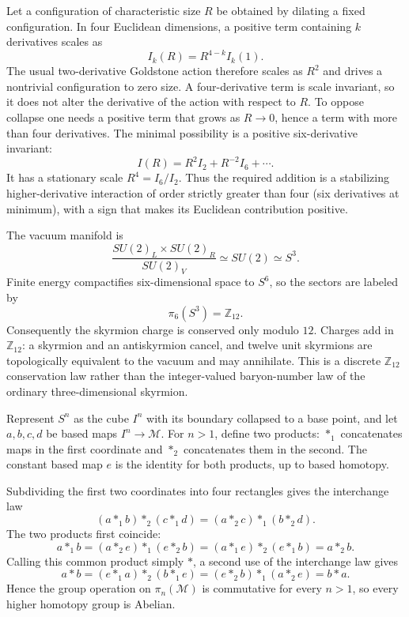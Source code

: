 \ExerciseEditorialNote

\begin{enumerate}
  Let a configuration of characteristic size \(R\) be obtained by
  dilating a fixed configuration.  In four Euclidean dimensions, a
  positive term containing \(k\) derivatives scales as
  \[
    I_k(R)=R^{4-k}I_k(1).
  \]
  The usual two-derivative Goldstone action therefore scales as \(R^2\)
  and drives a nontrivial configuration to zero size.  A four-derivative
  term is scale invariant, so it does not alter the derivative of the
  action with respect to \(R\).  To oppose collapse one needs a positive
  term that grows as \(R\to0\), hence a term with more than four
  derivatives.  The minimal possibility is a positive six-derivative
  invariant:
  \[
    I(R)=R^2I_2+R^{-2}I_6+\cdots .
  \]
  It has a stationary scale
  \(R^4=I_6/I_2\).  Thus the required addition is a stabilizing
  higher-derivative interaction of order strictly greater than four
  (six derivatives at minimum), with a sign that makes its Euclidean
  contribution positive.

  The vacuum manifold is
  \[
    \frac{SU(2)_L\times SU(2)_R}{SU(2)_V}\simeq SU(2)\simeq S^3.
  \]
  Finite energy compactifies six-dimensional space to \(S^6\), so the
  sectors are labeled by
  \[
    \pi_6(S^3)=\mathbb Z_{12}.
  \]
  Consequently the skyrmion charge is conserved only modulo \(12\).
  Charges add in \(\mathbb Z_{12}\): a skyrmion and an antiskyrmion
  cancel, and twelve unit skyrmions are topologically equivalent to the
  vacuum and may annihilate.  This is a discrete \(\mathbb Z_{12}\)
  conservation law rather than the integer-valued baryon-number law of
  the ordinary three-dimensional skyrmion.

  Represent \(S^n\) as the cube \(I^n\) with its boundary collapsed to a
  base point, and let \(a,b,c,d\) be based maps \(I^n\to\mathcal M\).
  For \(n>1\), define two products: \(*_1\) concatenates maps in the
  first coordinate and \(*_2\) concatenates them in the second.  The
  constant based map \(e\) is the identity for both products, up to
  based homotopy.

  Subdividing the first two coordinates into four rectangles gives the
  interchange law
  \[
    (a*_1b)*_2(c*_1d)
      =(a*_2c)*_1(b*_2d).
  \]
  The two products first coincide:
  \[
    a*_1b
      =(a*_2e)*_1(e*_2b)
      =(a*_1e)*_2(e*_1b)
      =a*_2b.
  \]
  Calling this common product simply \(*\), a second use of the
  interchange law gives
  \[
    a*b
      =(e*_1a)*_2(b*_1e)
      =(e*_2b)*_1(a*_2e)
      =b*a.
  \]
  Hence the group operation on \(\pi_n(\mathcal M)\) is commutative for
  every \(n>1\), so every higher homotopy group is Abelian.


\end{enumerate}
